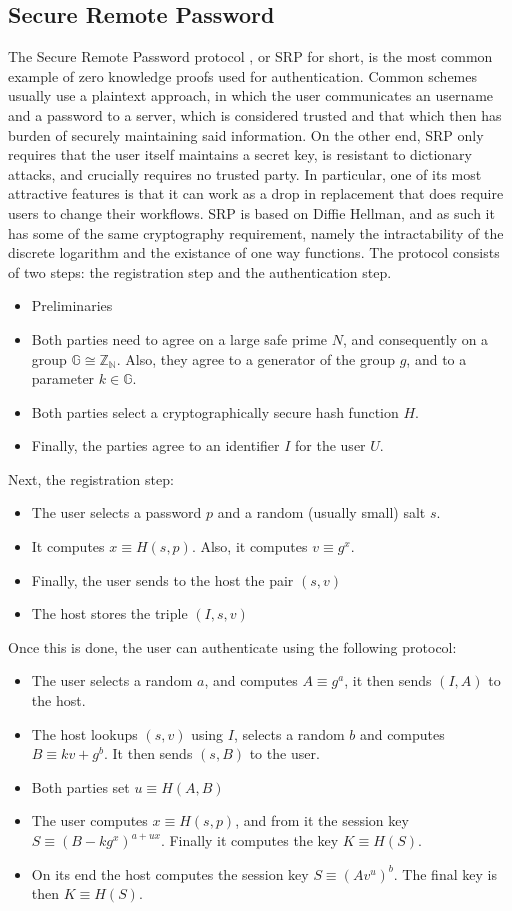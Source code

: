 \documentclass{article}
\begin{document}
\subsection{Secure Remote Password}
The Secure Remote Password protocol \cite{wuSecureRemotePassword1997}, or SRP for short, is the most common 
example of zero knowledge proofs used for authentication. Common schemes usually use a plaintext approach,
in which the user communicates an username and a password to a server, which is considered trusted and that 
which then has burden of securely maintaining said information. On the other end, SRP only requires that 
the user itself maintains a secret key, is resistant to dictionary attacks, and crucially requires no trusted party.
In particular, one of its most attractive features is that it can work as a drop in replacement that does require users
to change their workflows.
SRP is based on Diffie Hellman, and as such it has some of the same cryptography requirement, namely the intractability
of the discrete logarithm and the existance of one way functions.
The protocol consists of two steps: the registration step and the authentication step. 
\begin{itemize}
    \item Preliminaries
    \item Both parties need to agree on a large safe prime $N$, and consequently on a group $\mathbb{G} \cong \mathbb{Z_N}$. 
          Also, they agree to a generator of the group $g$, and to a parameter $k \in \mathbb{G}$. 
    \item Both parties select a cryptographically secure hash function $H$.
    \item Finally, the parties agree to an identifier $I$ for the user $U$.
\end{itemize}
Next, the registration step:
\begin{itemize}
    \item The user selects a password $p$ and a random (usually small) salt $s$. 
    \item It computes $x \equiv H(s, p)$. Also, it computes $v \equiv g^x$.
    \item Finally, the user sends to the host the pair $(s, v)$
    \item The host stores the triple $(I, s, v)$
\end{itemize}
Once this is done, the user can authenticate using the following protocol:
\begin{itemize}
    \item The user selects a random $a$, and computes $A \equiv g^a$, it then sends $(I, A)$ to the host.
    \item The host lookups $(s,v)$ using $I$, selects a random $b$ and computes $B \equiv kv + g^b$. It then sends $(s, B)$ to the user.
    \item Both parties set $u \equiv H(A, B)$
    \item The user computes $x \equiv H(s, p)$, and from it the session key $S \equiv (B - kg^x)^{a + ux}$. Finally it computes the key
          $K \equiv H(S)$. 
    \item On its end the host computes the session key $S \equiv (Av^u)^b$. The final key is then $K \equiv H(S)$.
\end{itemize}
\end{document}
